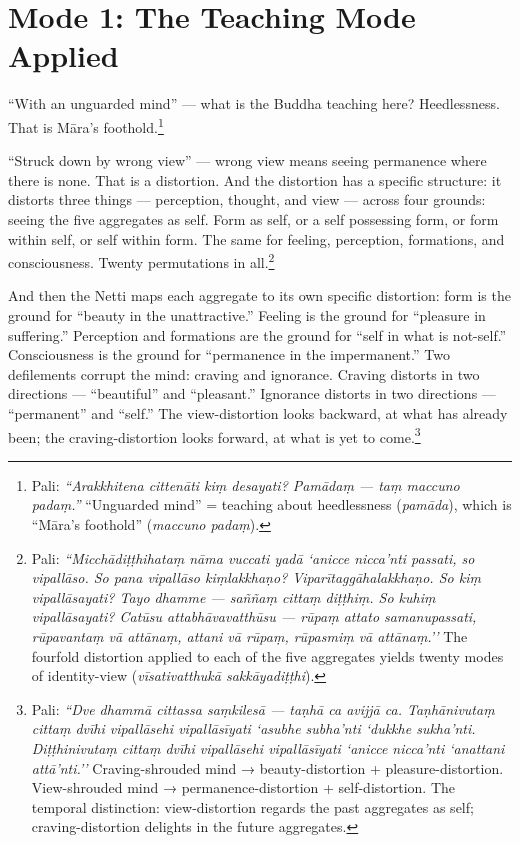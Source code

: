 \section*{Mode 1: The Teaching Mode Applied}

``With an unguarded mind'' --- what is the Buddha teaching here? Heedlessness. That is Māra's foothold.\footnote{Pali: \textit{``Arakkhitena cittenāti kiṃ desayati? Pamādaṃ --- taṃ maccuno padaṃ.''} ``Unguarded mind'' = teaching about heedlessness (\textit{pamāda}), which is ``Māra's foothold'' (\textit{maccuno padaṃ}).}

``Struck down by wrong view'' --- wrong view means seeing permanence where there is none. That is a distortion. And the distortion has a specific structure: it distorts three things --- perception, thought, and view --- across four grounds: seeing the five aggregates as self. Form as self, or a self possessing form, or form within self, or self within form. The same for feeling, perception, formations, and consciousness. Twenty permutations in all.\footnote{Pali: \textit{``Micchādiṭṭhihataṃ nāma vuccati yadā `anicce nicca'nti passati, so vipallāso. So pana vipallāso kiṃlakkhaṇo? Viparītaggāhalakkhaṇo. So kiṃ vipallāsayati? Tayo dhamme --- saññaṃ cittaṃ diṭṭhiṃ. So kuhiṃ vipallāsayati? Catūsu attabhāvavatthūsu --- rūpaṃ attato samanupassati, rūpavantaṃ vā attānaṃ, attani vā rūpaṃ, rūpasmiṃ vā attānaṃ.''} The fourfold distortion applied to each of the five aggregates yields twenty modes of identity-view (\textit{vīsativatthukā sakkāyadiṭṭhi}).}

And then the Netti maps each aggregate to its own specific distortion: form is the ground for ``beauty in the unattractive.'' Feeling is the ground for ``pleasure in suffering.'' Perception and formations are the ground for ``self in what is not-self.'' Consciousness is the ground for ``permanence in the impermanent.'' Two defilements corrupt the mind: craving and ignorance. Craving distorts in two directions --- ``beautiful'' and ``pleasant.'' Ignorance distorts in two directions --- ``permanent'' and ``self.'' The view-distortion looks backward, at what has already been; the craving-distortion looks forward, at what is yet to come.\footnote{Pali: \textit{``Dve dhammā cittassa saṃkilesā --- taṇhā ca avijjā ca. Taṇhānivutaṃ cittaṃ dvīhi vipallāsehi vipallāsīyati `asubhe subha'nti `dukkhe sukha'nti. Diṭṭhinivutaṃ cittaṃ dvīhi vipallāsehi vipallāsīyati `anicce nicca'nti `anattani attā'nti.''} Craving-shrouded mind → beauty-distortion + pleasure-distortion. View-shrouded mind → permanence-distortion + self-distortion. The temporal distinction: view-distortion regards the past aggregates as self; craving-distortion delights in the future aggregates.}

